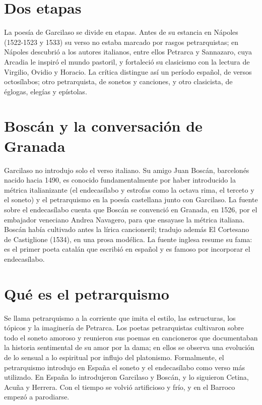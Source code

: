 \documentclass{book}
\begin{document}

\section{Dos etapas}

La poesía de Garcilaso se divide en etapas. Antes de su estancia en Nápoles (1522-1523 y 1533) su verso no estaba marcado por rasgos petrarquistas; en Nápoles descubrió a los autores italianos, entre ellos Petrarca y Sannazaro, cuya Arcadia le inspiró el mundo pastoril, y fortaleció su clasicismo con la lectura de Virgilio, Ovidio y Horacio. La crítica distingue así un período español, de versos octosílabos; otro petrarquista, de sonetos y canciones, y otro clasicista, de églogas, elegías y epístolas.


\section{Boscán y la conversación de Granada}

Garcilaso no introdujo solo el verso italiano. Su amigo Juan Boscán, barcelonés nacido hacia 1490, es conocido fundamentalmente por haber introducido la métrica italianizante (el endecasílabo y estrofas como la octava rima, el terceto y el soneto) y el petrarquismo en la poesía castellana junto con Garcilaso. La fuente sobre el endecasílabo cuenta que Boscán se convenció en Granada, en 1526, por el embajador veneciano Andrea Navagero, para que ensayase la métrica italiana. Boscán había cultivado antes la lírica cancioneril; tradujo además El Cortesano de Castiglione (1534), en una prosa modélica. La fuente inglesa resume su fama: es el primer poeta catalán que escribió en español y es famoso por incorporar el endecasílabo.


\section{Qué es el petrarquismo}

Se llama petrarquismo a la corriente que imita el estilo, las estructuras, los tópicos y la imaginería de Petrarca. Los poetas petrarquistas cultivaron sobre todo el soneto amoroso y reunieron sus poemas en cancioneros que documentaban la historia sentimental de su amor por la dama; en ellos se observa una evolución de lo sensual a lo espiritual por influjo del platonismo. Formalmente, el petrarquismo introdujo en España el soneto y el endecasílabo como verso más utilizado. En España lo introdujeron Garcilaso y Boscán, y lo siguieron Cetina, Acuña y Herrera. Con el tiempo se volvió artificioso y frío, y en el Barroco empezó a parodiarse.
\end{document}

